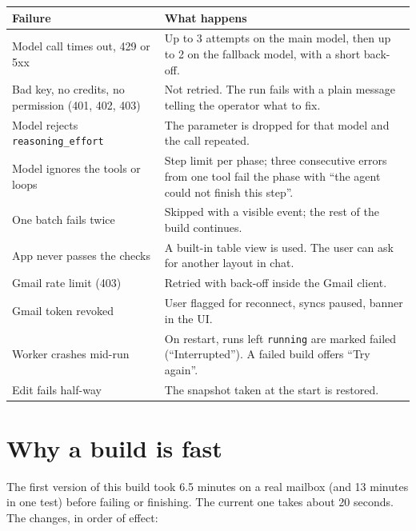 \documentclass[10pt,a4paper]{article}
\newcommand{\code}[1]{\texttt{\small #1}}
\begin{document}
\begin{center}\small
\begin{tabularx}{\linewidth}{@{}P{4.2cm}L@{}}
\toprule
\textbf{Failure} & \textbf{What happens} \\
\midrule
Model call times out, 429 or 5xx & Up to 3 attempts on the main model, then up to 2 on the fallback model, with a short back-off. \\
Bad key, no credits, no permission (401, 402, 403) & Not retried. The run fails with a plain message telling the operator what to fix. \\
Model rejects \code{reasoning\_effort} & The parameter is dropped for that model and the call repeated. \\
Model ignores the tools or loops & Step limit per phase; three consecutive errors from one tool fail the phase with ``the agent could not finish this step''. \\
One batch fails twice & Skipped with a visible event; the rest of the build continues. \\
App never passes the checks & A built-in table view is used. The user can ask for another layout in chat. \\
Gmail rate limit (403) & Retried with back-off inside the Gmail client. \\
Gmail token revoked & User flagged for reconnect, syncs paused, banner in the UI. \\
Worker crashes mid-run & On restart, runs left \code{running} are marked failed (``Interrupted''). A failed build offers ``Try again''. \\
Edit fails half-way & The snapshot taken at the start is restored. \\
\bottomrule
\end{tabularx}
\end{center}

\section{Why a build is fast}

The first version of this build took 6.5 minutes on a real mailbox (and 13 minutes in one
test) before failing or finishing. The current one takes about 20 seconds. The changes, in order of effect:
\end{document}
